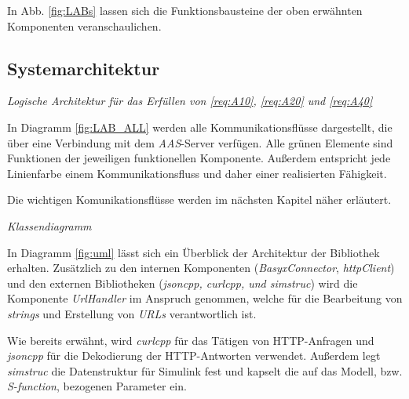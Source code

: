 In Abb. \ref{fig:LABs} lassen sich die Funktionsbausteine der oben erwähnten Komponenten veranschaulichen. 




\subsection{Systemarchitektur} \label{SysArch}

\emph{Logische Architektur für das Erfüllen von \ref{req:A10}, \ref{req:A20} und \ref{req:A40}}

In Diagramm \ref{fig:LAB_ALL} werden alle Kommunikationsflüsse dargestellt, die über eine Verbindung mit dem \textit{AAS}-Server verfügen. Alle grünen Elemente sind Funktionen der jeweiligen funktionellen Komponente. Außerdem entspricht jede Linienfarbe einem Kommunikationsfluss und daher einer realisierten Fähigkeit. 

Die wichtigen Komunikationsflüsse werden im nächsten Kapitel näher erläutert.


\emph{Klassendiagramm}

In Diagramm \ref{fig:uml} lässt sich ein Überblick der Architektur der Bibliothek erhalten. Zusätzlich zu den internen Komponenten (\textit{BasyxConnector}, \textit{httpClient}) und den externen Bibliotheken (\textit{jsoncpp, curlcpp, und simstruc}) wird die Komponente \textit{UrlHandler} im Anspruch genommen, welche für die Bearbeitung von \textit{strings} und Erstellung von \textit{URLs} verantwortlich ist.

Wie bereits erwähnt, wird \textit{curlcpp} für das Tätigen von HTTP-Anfragen und \textit{jsoncpp} für die Dekodierung der HTTP-Antworten verwendet. Außerdem legt \textit{simstruc} die Datenstruktur für Simulink fest und kapselt die auf das Modell, bzw. \textit{S-function}, bezogenen Parameter ein. 




